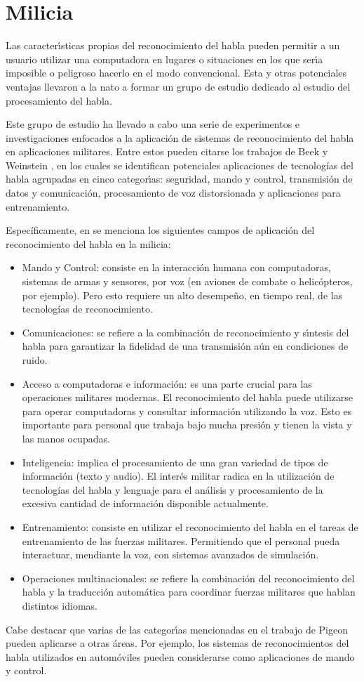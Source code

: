 \section{Milicia}
\label{sec:milicia}

Las caracter{\'\i}sticas propias del reconocimiento del habla pueden permitir a un usuario utilizar una computadora
en lugares o situaciones en los que ser{\'\i}a imposible o peligroso hacerlo en el modo convencional\cite{Rufiner2004}.
Esta y otras potenciales ventajas llevaron a la \gls{nato} a formar un grupo de estudio dedicado al estudio del
procesamiento del habla.

Este grupo de estudio ha llevado a cabo una serie de experimentos e investigaciones
enfocados a la aplicaci\'on de sistemas de reconocimiento del habla en aplicaciones militares.
Entre estos pueden citarse los trabajos de Beek \cite{BeekAn1977} y Weinstein \cite{WeinsteinOpportunities1991},
en los cuales se identifican potenciales aplicaciones de tecnolog\'ias del habla agrupadas en cinco categor{\'\i}as:
seguridad, mando y control, transmisi\'on de datos y comunicaci\'on, procesamiento de voz distorsionada
y aplicaciones para entrenamiento.

Espec\'ificamente, en \cite{PigeonUse2006} se menciona los siguientes campos de aplicaci\'on del reconocimiento 
del habla en la milicia:

\begin{itemize}
    \item Mando y Control: consiste en la interacci\'on humana con computadoras, sistemas
	de armas y sensores, por voz (en aviones de combate o helic\'opteros, por ejemplo). Pero esto
	requiere un alto desempe\~no, en tiempo real, de las tecnolog\'ias de reconocimiento.
	\item Comunicaciones: se refiere a la combinaci\'on de reconocimiento y s{\'\i}ntesis del habla para
	garantizar la fidelidad de una transmisi\'on a\'un en condiciones de ruido.
    \item Acceso a computadoras e informaci\'on: es una parte crucial para las operaciones militares modernas. El
	reconocimiento del habla puede utilizarse para operar computadoras y consultar informaci\'on utilizando la voz.
	Esto es importante para personal que trabaja bajo mucha presi\'on y tienen la vista y las manos ocupadas.
    \item Inteligencia: implica el procesamiento de una gran variedad de tipos de informaci\'on (texto y audio). 
    El inter\'es militar radica en la utilizaci\'on de tecnolog\'ias del habla y lenguaje para el an\'alisis y
    procesamiento de la excesiva cantidad de informaci\'on disponible actualmente.
    \item Entrenamiento: consiste en utilizar el reconocimiento del habla en el tareas de entrenamiento de las fuerzas
	militares. Permitiendo que el personal pueda interactuar, mendiante la voz, con sistemas avanzados de simulaci\'on.
	\item Operaciones multinacionales: se refiere la combinaci\'on del reconocimiento del habla y la traducci\'on
	autom\'atica para coordinar fuerzas militares que hablan distintos idiomas.
\end{itemize}

Cabe destacar que varias de las categor{\'\i}as mencionadas en el trabajo de Pigeon pueden aplicarse
a otras \'areas. Por ejemplo, los sistemas de reconocimientos del habla utilizados en autom\'oviles 
pueden considerarse como aplicaciones de mando y control.
